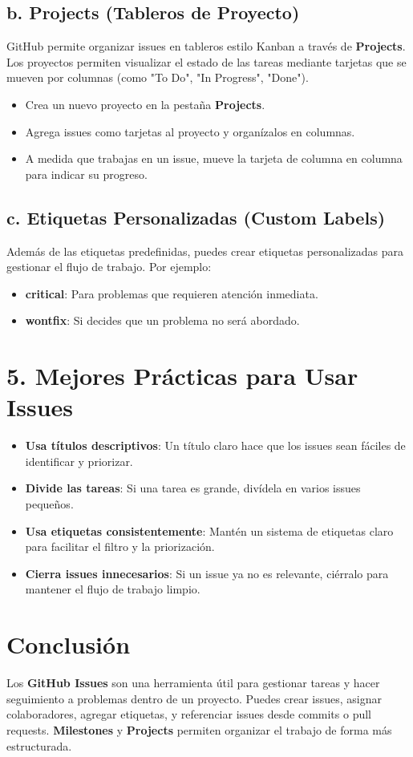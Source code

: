 \documentclass{article}
\begin{document}
\subsection{b. Projects (Tableros de Proyecto)}
GitHub permite organizar issues en tableros estilo Kanban a través de \textbf{Projects}. Los proyectos permiten visualizar el estado de las tareas mediante tarjetas que se mueven por columnas (como "To Do", "In Progress", "Done").
\begin{itemize}
    \item Crea un nuevo proyecto en la pestaña \textbf{Projects}.
    \item Agrega issues como tarjetas al proyecto y organízalos en columnas.
    \item A medida que trabajas en un issue, mueve la tarjeta de columna en columna para indicar su progreso.
\end{itemize}

\subsection{c. Etiquetas Personalizadas (Custom Labels)}
Además de las etiquetas predefinidas, puedes crear etiquetas personalizadas para gestionar el flujo de trabajo. Por ejemplo:
\begin{itemize}
    \item \textbf{critical}: Para problemas que requieren atención inmediata.
    \item \textbf{wontfix}: Si decides que un problema no será abordado.
\end{itemize}

\section{5. Mejores Prácticas para Usar Issues}
\begin{itemize}
    \item \textbf{Usa títulos descriptivos}: Un título claro hace que los issues sean fáciles de identificar y priorizar.
    \item \textbf{Divide las tareas}: Si una tarea es grande, divídela en varios issues pequeños.
    \item \textbf{Usa etiquetas consistentemente}: Mantén un sistema de etiquetas claro para facilitar el filtro y la priorización.
    \item \textbf{Cierra issues innecesarios}: Si un issue ya no es relevante, ciérralo para mantener el flujo de trabajo limpio.
\end{itemize}

\section{Conclusión}
Los \textbf{GitHub Issues} son una herramienta útil para gestionar tareas y hacer seguimiento a problemas dentro de un proyecto. Puedes crear issues, asignar colaboradores, agregar etiquetas, y referenciar issues desde commits o pull requests. \textbf{Milestones} y \textbf{Projects} permiten organizar el trabajo de forma más estructurada.
\end{document}
